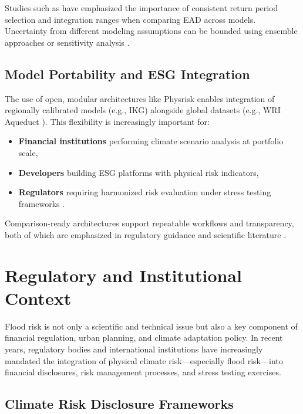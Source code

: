 Studies such as \cite{ward_how_2011} have emphasized the importance of consistent return period selection and integration ranges when comparing EAD across models. Uncertainty from different modeling assumptions can be bounded using ensemble approaches or sensitivity analysis \cite{bressan_asset-level_2024}.

\subsection{Model Portability and ESG Integration}

The use of open, modular architectures like Physrisk enables integration of regionally calibrated models (e.g., IKG) alongside global datasets (e.g., WRI Aqueduct \cite{wri_aqueduct_floods}). This flexibility is increasingly important for:

\begin{itemize}
    \item \textbf{Financial institutions} performing climate scenario analysis at portfolio scale,
    \item \textbf{Developers} building ESG platforms with physical risk indicators,
    \item \textbf{Regulators} requiring harmonized risk evaluation under stress testing frameworks \cite{ecb2020, tcfd2017}.
\end{itemize}

Comparison-ready architectures support repeatable workflows and transparency, both of which are emphasized in regulatory guidance and scientific literature \cite{bavandi_physical_2022}.


\section{Regulatory and Institutional Context}

Flood risk is not only a scientific and technical issue but also a key component of financial regulation, urban planning, and climate adaptation policy. In recent years, regulatory bodies and international institutions have increasingly mandated the integration of physical climate risk—especially flood risk—into financial disclosures, risk management processes, and stress testing exercises.

\subsection{Climate Risk Disclosure Frameworks}

